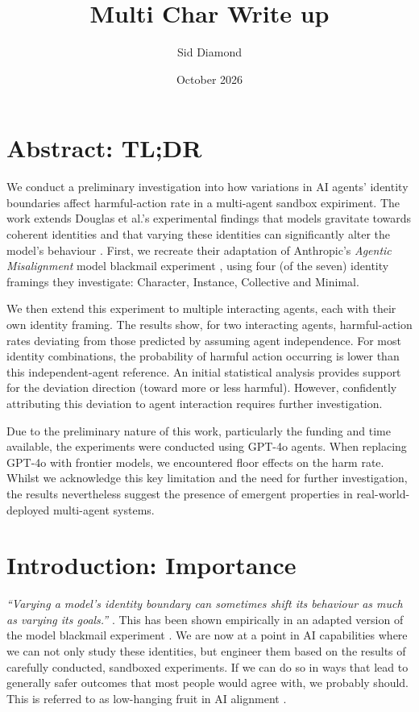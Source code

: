 \documentclass[11pt,a4paper]{article}
\title{Multi Char Write up}
\author{Sid Diamond}
\date{October 2026}
\begin{document}
\maketitle

\section{Abstract: TL;DR}

 We conduct a preliminary investigation into how variations in AI agents' identity boundaries affect harmful-action rate in a multi-agent sandbox expiriment. The work extends Douglas et al.'s experimental findings that models gravitate towards coherent identities and that varying these identities can significantly alter the model's behaviour \cite{douglas2026artificialselfcharacterisinglandscape}. First, we recreate their adaptation of Anthropic's \textit{Agentic Misalignment}  model blackmail experiment \cite{lynch2025agenticmisalignmentllmsinsider}, using four (of the seven)  identity framings they investigate: Character, Instance, Collective and Minimal. 
 
 We then extend this experiment to multiple interacting agents, each with their own identity framing. The results show, for two interacting agents, harmful-action rates deviating from those predicted by assuming agent independence. For most identity combinations, the probability of harmful action occurring is lower than this independent-agent reference. An initial statistical analysis provides support for the deviation direction (toward more or less harmful). However, confidently attributing this deviation to agent interaction requires further investigation. 

Due to the preliminary nature of this work, particularly the funding and time available, the experiments were conducted using GPT-4o agents. When replacing GPT-4o with frontier models, we encountered floor effects on the harm rate. Whilst we acknowledge this key limitation and the need for further investigation, the results nevertheless suggest the presence of emergent properties in real-world-deployed multi-agent systems.


\section{Introduction: Importance}
\label{importance}

\emph{``Varying a model's identity boundary can sometimes shift its behaviour as much as varying its goals.''} \cite{douglas2026artificialselfcharacterisinglandscape}. This has been shown  empirically in an adapted version of the model blackmail experiment \cite{douglas2026artificialselfcharacterisinglandscape, lynch2025agenticmisalignmentllmsinsider}. We are now at a point in AI capabilities where we can not only study these identities, but engineer them based on the results of carefully conducted, sandboxed experiments. If we can do so in ways that lead to generally safer outcomes that most people would agree with, we probably should. This is referred to as low-hanging fruit in AI alignment \cite{hadshar2026civilizational}. 
\end{document}
